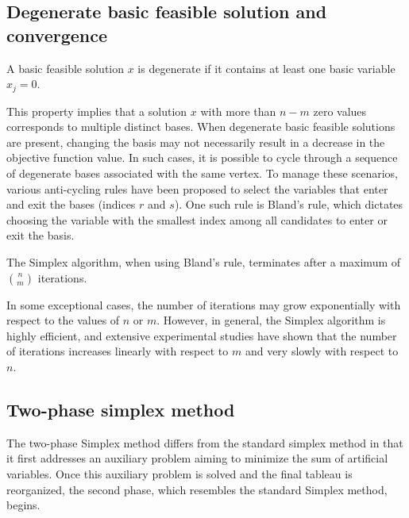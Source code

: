 \subsection{Degenerate basic feasible solution and convergence}
\begin{definition}
    A basic feasible solution $x$ is degenerate if it contains at least one basic variable $x_j=0$.
\end{definition}
This property implies that a solution $x$ with more than $n - m$ zero values corresponds to multiple distinct bases. 
When degenerate basic feasible solutions are present, changing the basis may not necessarily result in a decrease in the objective function value.
In such cases, it is possible to cycle through a sequence of degenerate bases associated with the same vertex.
To manage these scenarios, various anti-cycling rules have been proposed to select the variables that enter and exit the bases (indices $r$ and $s$). 
One such rule is Bland's rule, which dictates choosing the variable with the smallest index among all candidates to enter or exit the basis.
\begin{proposition}
    The Simplex algorithm, when using Bland's rule, terminates after a maximum of $\binom{n}{m}$ iterations.
\end{proposition}
In some exceptional cases, the number of iterations may grow exponentially with respect to the values of $n$ or $m$. 
However, in general, the Simplex algorithm is highly efficient, and extensive experimental studies have shown that the number of iterations increases linearly with respect to $m$ and very slowly with respect to $n$. 

\subsection{Two-phase simplex method}
The two-phase Simplex method differs from the standard simplex method in that it first addresses an auxiliary problem aiming to minimize the sum of artificial variables. 
Once this auxiliary problem is solved and the final tableau is reorganized, the second phase, which resembles the standard Simplex method, begins.

